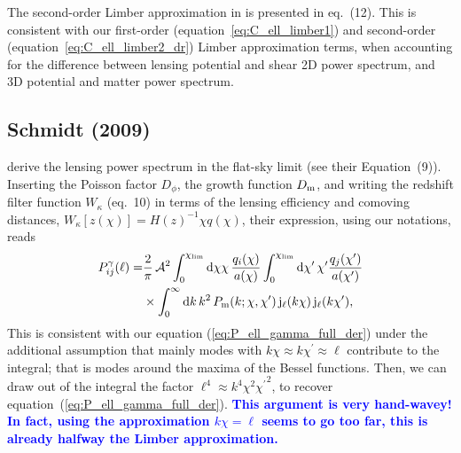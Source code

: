 \documentclass[fleqn,usenatbib]{mnras} %
\newcommand{\pref}{{\cal A}}
\newcommand{\mk}[1]{{\bf\textcolor{blue}{#1}}}
\begin{document}
\begin{appendix}
The second-order Limber approximation in \cite{2008PhRvD..78l3506L} is
presented in eq.~(12). This is consistent with our first-order
(equation~\ref{eq:C_ell_limber1}) and second-order (equation~\ref{eq:C_ell_limber2_dr}) Limber
approximation terms, when accounting for the difference between lensing
potential and shear 2D power spectrum, and 3D potential and matter power
spectrum.


\subsection{Schmidt (2009)}
\label{sec:schmidt08}

\cite{2008PhRvD..78d3002S} derive the lensing power spectrum in the
flat-sky limit (see their Equation~(9)). Inserting the Poisson factor $D_\phi$, 
 the growth function $D_{\rm m}$, and writing the redshift filter
function $W_\kappa$ (eq.~10) in terms of the lensing efficiency and comoving distances,
$W_\kappa[z(\chi)] = H(z)^{-1} \chi q(\chi)$, their expression, using our notations, reads
%
\begin{align}
  P_{ij}^\gamma(\ell) = & \frac 2 \pi \, \pref^2
                 \int_{0}^{\chi_{\rm lim}} {\rm d} \chi \chi \, \frac{q_i(\chi)}{a(\chi)}
                \int_{0}^{\chi_{\rm lim}} {\rm d} \chi^\prime\, \chi^\prime
                \frac{q_j(\chi^\prime)}{a(\chi^\prime)}
                \nonumber \\
                & \times \int_0^\infty {\rm d} k \, k^2 \, P_{\rm m}(k; \chi, \chi^\prime) \,
                {\rm j}_\ell(k \chi) \, {\rm j}_\ell(k \chi^\prime) ,
  \label{eq:P_ell_gamma}
\end{align}
%
This is consistent with our equation (\ref{eq:P_ell_gamma_full_der}) under the additional assumption that
mainly modes with $k \chi \approx k \chi^\prime \approx \ell$ contribute to the integral; that is modes
around the maxima of the Bessel functions. Then, we can draw out of the integral the factor $\ell^4 \approx k^4 \chi^2 {\chi^\prime}^2$,
to recover equation~(\ref{eq:P_ell_gamma_full_der}).
\mk{This argument is very hand-wavey! In fact, using the approximation $k \chi = \ell$ seems to go too far, this is already halfway the Limber approximation.}



\end{appendix}
\end{document}
